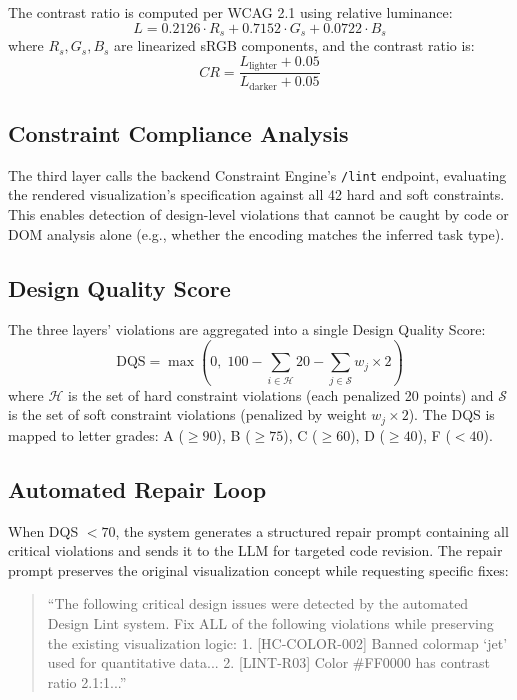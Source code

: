 \documentclass[journal]{vgtc}
\newcommand{\eg}{e.g.}
\begin{document}
The contrast ratio is computed per WCAG 2.1 using relative luminance:
\begin{equation}
L = 0.2126 \cdot R_s + 0.7152 \cdot G_s + 0.0722 \cdot B_s
\end{equation}
where $R_s, G_s, B_s$ are linearized sRGB components, and the contrast ratio is:
\begin{equation}
CR = \frac{L_{\text{lighter}} + 0.05}{L_{\text{darker}} + 0.05}
\end{equation}

\subsection{Constraint Compliance Analysis}

The third layer calls the backend Constraint Engine's \texttt{/lint} endpoint, evaluating the rendered visualization's specification against all 42 hard and soft constraints.
This enables detection of design-level violations that cannot be caught by code or DOM analysis alone (\eg{}, whether the encoding matches the inferred task type).

\subsection{Design Quality Score}

The three layers' violations are aggregated into a single Design Quality Score:
\begin{equation}
\text{DQS} = \max\left(0, \; 100 - \sum_{i \in \mathcal{H}} 20 - \sum_{j \in \mathcal{S}} w_j \times 2\right)
\end{equation}
where $\mathcal{H}$ is the set of hard constraint violations (each penalized 20 points) and $\mathcal{S}$ is the set of soft constraint violations (penalized by weight $w_j \times 2$).
The DQS is mapped to letter grades: A ($\geq 90$), B ($\geq 75$), C ($\geq 60$), D ($\geq 40$), F ($< 40$).

\subsection{Automated Repair Loop}

When DQS $< 70$, the system generates a structured repair prompt containing all critical violations and sends it to the LLM for targeted code revision.
The repair prompt preserves the original visualization concept while requesting specific fixes:

\begin{quote}
\small
``The following critical design issues were detected by the automated Design Lint system. Fix ALL of the following violations while preserving the existing visualization logic:
1. [HC-COLOR-002] Banned colormap `jet' used for quantitative data...
2. [LINT-R03] Color \#FF0000 has contrast ratio 2.1:1...''
\end{quote}
\end{document}
